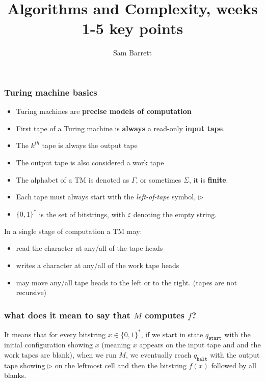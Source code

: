 \documentclass{beamer}
\title{Algorithms and Complexity, weeks 1-5 key points}
\author{Sam Barrett}
\newcommand{\qs}{q_{\texttt{start}}}
\newcommand{\qh}{q_{\texttt{halt}}}
\begin{document}
\begin{frame}
\titlepage
\end{frame}

\begin{frame}[allowframebreaks]
  \frametitle{Turing machine basics}

  \begin{itemize}
    \item Turing machines are \textbf{precise models of computation}
    \item First tape of a Turing machine is \textbf{always} a read-only \textbf{input tape}.
    \item The $k^{th}$ tape is always the output tape
    \item The output tape is also considered a work tape
    \item The alphabet of a TM is denoted as \(\Gamma\), or sometimes $\Sigma$, it is \textbf{finite}.
    \item Each tape must always start with the \textit{left-of-tape} symbol, $\rhd$
    \item $\{ 0,1 \} ^{*}$ is the set of bitstrings, with $\varepsilon$ denoting the empty string.
  \end{itemize}

  \framebreak{}

  In a single stage of computation a TM may:
  \begin{itemize}
    \item read the character at any/all of the tape heads
    \item writes a character at any/all of the work tape heads
    \item may move any/all tape heads to the left or to the right. (tapes are not recursive)
  \end{itemize}

\end{frame}

\begin{frame}
\frametitle{what does it mean to say that $M$ \textbf{computes} $f$?}

It means that for every bitstring $x \in \{ 0,1 \}^{*}$, if we start in state $\qs$ with the initial configuration showing $x$ (meaning $x$ appears on the input tape and and the work tapes are blank), when we run $M$, we eventually reach $\qh$ with the output tape showing $\rhd$ on the leftmost cell and then the bitstring $f(x)$ followed by all blanks.

\end{frame}
\end{document}
